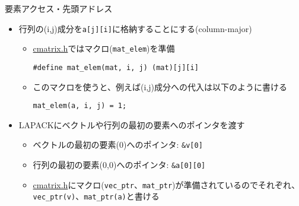 \begin{frame}[t,fragile]{要素アクセス・先頭アドレス}
  \begin{itemize}
  \item 行列の(i,j)成分を\verb+a[j][i]+に格納することにする(column-major)
    \begin{itemize}
      \item \href{https://github.com/todo-group/computer-experiments/blob/master/exercise/matrix/cmatrix.h}{cmatrix.h}ではマクロ(\verb+mat_elem+)を準備
\begin{lstlisting}
#define mat_elem(mat, i, j) (mat)[j][i]
\end{lstlisting}
\item このマクロを使うと、例えば(i,j)成分への代入は以下のように書ける
\begin{lstlisting}
mat_elem(a, i, j) = 1;
\end{lstlisting}
\end{itemize}
  \item LAPACKにベクトルや行列の最初の要素へのポインタを渡す
    \begin{itemize}
      \item ベクトルの最初の要素(0)へのポインタ: \verb+&v[0]+
      \item 行列の最初の要素(0,0)へのポインタ: \verb+&a[0][0]+
      \item \href{https://github.com/todo-group/computer-experiments/blob/master/exercise/matrix/cmatrix.h}{cmatrix.h}にマクロ({\tt vec\_ptr}、{\tt mat\_ptr})が準備されているのでそれぞれ、{\tt vec\_ptr(v)}、{\tt mat\_ptr(a)}と書ける
    \end{itemize}
  \end{itemize}
\end{frame}

